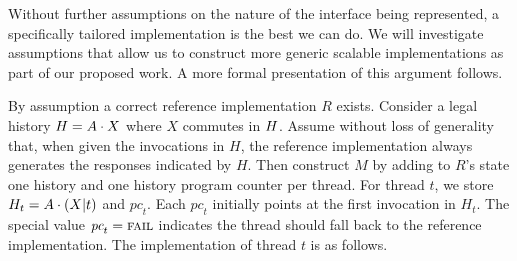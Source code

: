 Without further assumptions on the nature of the interface being
represented, a specifically tailored implementation is the best we can
do.
%
We will investigate assumptions that allow us to construct more generic
scalable implementations as part of our proposed work.
%
A more formal presentation of this argument follows.

By assumption a correct reference implementation $R$ exists.
%
Consider a legal history  $H = A \cdot X$ where $X$ commutes in
$H$.
%
Assume without loss of generality that, when given the invocations in
$H$, the reference implementation always generates the responses
indicated by $H$.
%
%
Then construct $M$ by adding to $R$'s state one history and one history
program counter per thread.
%
For thread $t$, we store $H_t = A \cdot
  (X|t)$ and $\textit{pc}_t$. Each $\textit{pc}_t$
  initially points at the first invocation in $H_t$. The special value
  $\textit{pc}_t = \textsc{fail}$ indicates the thread should fall back to the
  reference implementation.
%
The implementation of thread $t$ is as follows.
